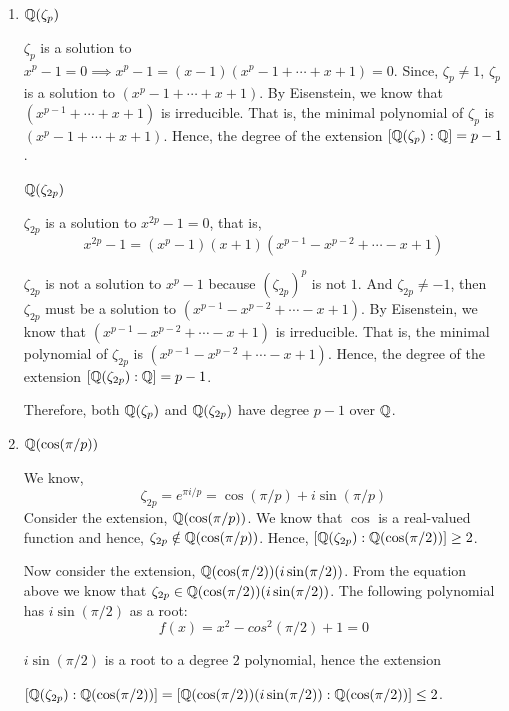 \documentclass[12pt]{article}
\begin{document}
\begin{solution}
    \bbni
    \begin{enumerate}
        \item $\mathbb Q(\zeta_p)$ 
        
        $\zeta_p$ is a solution to $x^p - 1 = 0 \implies x^p - 1 = (x-1)(x^p-1 + \cdots +x +1) = 0$. Since, $\zeta_p \neq 1$, $\zeta_p$ is a solution to $(x^p-1 + \cdots +x +1)$. By Eisenstein, we know that $(x^{p-1} + \cdots +x +1)$ is irreducible. That is, the minimal polynomial of $\zeta_p$ is $(x^p-1 + \cdots +x +1)$. Hence, the degree of the extension $[\mathbb Q(\zeta_p) : \mathbb Q] = p-1$. 
        
        \bbni

        $\mathbb Q(\zeta_{2p})$

        $\zeta_{2p}$ is a solution to $x^{2p} - 1 = 0$, that is, 
        \[x^{2p} - 1 = (x^p -1)(x+1)(x^{p-1}-x^{p-2} + \cdots -x +1)\]

        $\zeta_{2p}$ is not a solution to $x^p-1$ because $(\zeta_{2p})^p$ is not $1$. And $\zeta_{2p} \neq-1$, then $\zeta_{2p}$ must be a solution to $(x^{p-1}-x^{p-2} + \cdots -x +1)$.  By Eisenstein, we know that $(x^{p-1}-x^{p-2} + \cdots -x +1)$ is irreducible. That is, the minimal polynomial of $\zeta_{2p}$ is $(x^{p-1}-x^{p-2} + \cdots -x +1)$. Hence, the degree of the extension $[\mathbb Q(\zeta_{2p}) : \mathbb Q] = p-1$. 

        \bbni

        Therefore, both $\mathbb Q(\zeta_p)$ and $\mathbb Q(\zeta_{2p})$ have degree $p-1$ over $\mathbb Q$. 

        \item $\mathbb Q(\cos(\pi/p))$
        
        We know, 
        \[\zeta_{2p} = e^{{\pi i}/p} = \cos(\pi/p) + i \sin(\pi/p)\]
        Consider the extension, $\mathbb Q(\cos(\pi/p))$. We know that $\cos$ is a real-valued function and hence, $\zeta_{2p} \notin \mathbb Q(\cos(\pi/p))$. Hence, $[\mathbb Q(\zeta_{2p}): \mathbb Q(\cos(\pi/2))] \geq 2$. 

        Now consider the extension, $\mathbb Q(\cos(\pi/2))(i\sin(\pi/2))$. From the equation above we know that $\zeta_{2p} \in \mathbb Q(\cos(\pi/2))(i\sin(\pi/2))$. The following polynomial has $i\sin(\pi/2)$ as a root:
        \[f(x) = x^2 - cos^2(\pi/2) + 1 = 0\]

        $i\sin(\pi/2)$ is a root to a degree $2$ polynomial, hence the extension 
        
        $[\mathbb Q(\zeta_{2p}): \mathbb Q(\cos(\pi/2))] = [\mathbb Q(\cos(\pi/2))(i\sin(\pi/2)): \mathbb Q(\cos(\pi/2))] \leq 2$. 


\end{enumerate}
\end{solution}
\end{document}
